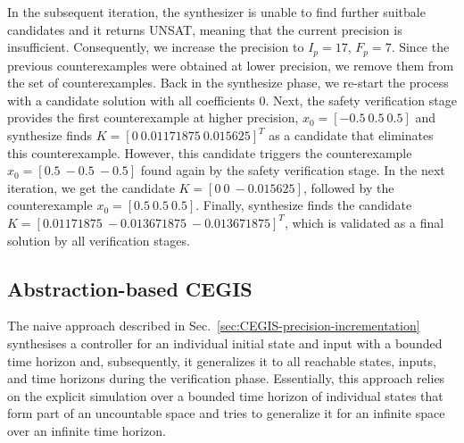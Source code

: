 \documentclass[runningheads,a4paper]{llncs}
\begin{document}
In the subsequent iteration, the synthesizer is unable to find further 
suitbale candidates and it returns UNSAT, meaning that the current precision is
insufficient.  Consequently, we increase the precision to $I_p=17$,
$F_p=7$.
%
Since the previous counterexamples were obtained at lower precision,
we remove them from the set of counterexamples.  Back in the {\sc
  synthesize} phase, we re-start the process with a candidate solution
with all coefficients $0$.  Next, the {\sc safety} verification stage
provides the first counterexample at higher precision, $x_0=[-0.5
  \ 0.5 \ 0.5]$ and {\sc synthesize} finds $K=[0 \ 0.01171875
  \ 0.015625]^T$ as a candidate that eliminates this counterexample.
However, this candidate triggers the counterexample
$x_0=[0.5\ -0.5\ -0.5]$ found again by the {\sc safety} verification
stage.  In the next iteration, we get the candidate $K=[0 \ 0
  \ -0.015625]$, followed by the counterexample $x_0 = [0.5 \ 0.5
  \ 0.5]$. Finally, {\sc synthesize} finds the candidate $K=[0.01171875
  \ -0.013671875 \ -0.013671875]^T$, which is validated as a final
solution by all verification stages.

\subsection{Abstraction-based CEGIS}
\label{sec:CEGIS-abstraction-refinement}



  The naive approach described in Sec.~\ref{sec:CEGIS-precision-incrementation}
  synthesises a controller for an individual initial state
and input with a bounded time horizon and, subsequently, it generalizes it to all reachable states,
inputs, and time horizons during the verification phase.
Essentially, this approach relies on the explicit
simulation over a bounded time horizon of individual states that form
part of an uncountable space and tries to generalize it for an
infinite space over an infinite time horizon.

\end{document}

